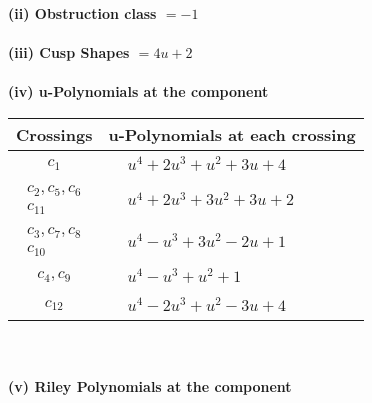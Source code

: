 \documentclass[1p]{elsarticle_modified}
\theoremstyle{definition}
\begin{document}
\flushleft \textbf{(ii) Obstruction class $= -1$}\\~\\
\flushleft \textbf{(iii) Cusp Shapes $= 4 u+2$}\\~\\
\newpage\renewcommand{\arraystretch}{1}
\flushleft \textbf{(iv) u-Polynomials at the component}\newline \\
\begin{tabular}{m{50pt}|m{274pt}}
Crossings & \hspace{64pt}u-Polynomials at each crossing \\
\hline $$\begin{aligned}c_{1}\end{aligned}$$&$\begin{aligned}
&u^4+2 u^3+u^2+3 u+4
\end{aligned}$\\
\hline $$\begin{aligned}c_{2},c_{5},c_{6}\\c_{11}\end{aligned}$$&$\begin{aligned}
&u^4+2 u^3+3 u^2+3 u+2
\end{aligned}$\\
\hline $$\begin{aligned}c_{3},c_{7},c_{8}\\c_{10}\end{aligned}$$&$\begin{aligned}
&u^4- u^3+3 u^2-2 u+1
\end{aligned}$\\
\hline $$\begin{aligned}c_{4},c_{9}\end{aligned}$$&$\begin{aligned}
&u^4- u^3+u^2+1
\end{aligned}$\\
\hline $$\begin{aligned}c_{12}\end{aligned}$$&$\begin{aligned}
&u^4-2 u^3+u^2-3 u+4
\end{aligned}$\\
\hline
\end{tabular}\\~\\
\newpage\renewcommand{\arraystretch}{1}
\flushleft \textbf{(v) Riley Polynomials at the component}\newline \\
\end{document}
